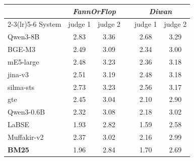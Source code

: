 \begin{tabular}{l cc c cc}
\toprule
& \multicolumn{2}{c}{\textit{FannOrFlop}} & & \multicolumn{2}{c}{\textit{Diwan}} \\
\cmidrule(lr){2-3}\cmidrule(lr){5-6}
System & judge 1 & judge 2 & & judge 1 & judge 2 \\
\midrule
Qwen3-8B & 2.83 & 3.36 & & 2.68 & 3.29 \\
BGE-M3 & 2.49 & 3.09 & & 2.34 & 3.00 \\
mE5-large & 2.48 & 3.23 & & 2.36 & 3.18 \\
jina-v3 & 2.51 & 3.19 & & 2.48 & 3.18 \\
silma-sts & 2.73 & 3.23 & & 2.56 & 3.17 \\
gte & 2.45 & 3.04 & & 2.10 & 2.90 \\
Qwen3-0.6B & 2.32 & 3.08 & & 2.18 & 3.02 \\
LaBSE & 1.93 & 2.82 & & 1.59 & 2.58 \\
Muffakir-v2 & 2.37 & 3.02 & & 2.16 & 2.99 \\
\midrule
\textbf{BM25} & 1.96 & 2.84 & & 1.70 & 2.69 \\
\bottomrule
\end{tabular}
